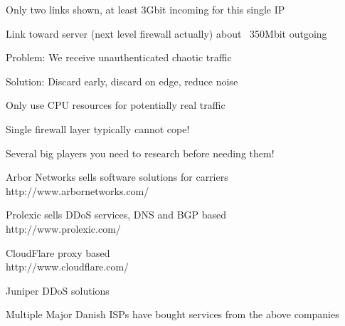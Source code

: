 \documentclass[20pt,landscape,a4paper,footrule]{foils}
\begin{document}
\centerline{Only two links shown, at least 3Gbit incoming for this single IP}

\centerline{Link toward server (next level firewall actually) about ~350Mbit outgoing}

\begin{list1}
\item Problem: We receive unauthenticated chaotic traffic

\item Solution: Discard early, discard on edge, reduce noise

\item Only use CPU resources for potentially real traffic
\end{list1}

\centerline{Single firewall layer typically cannot cope!}





\begin{list1}
\item Several big players you need to research before needing them!
\item Arbor Networks sells software solutions for carriers\\
http://www.arbornetworks.com/

\item Prolexic sells DDoS services, DNS and BGP based\\
http://www.prolexic.com/

\item CloudFlare proxy based\\
http://www.cloudflare.com/

\item Juniper DDoS solutions
\end{list1}


\vskip 2cm
\centerline{Multiple Major Danish ISPs have bought services from the above companies}



\end{document}
